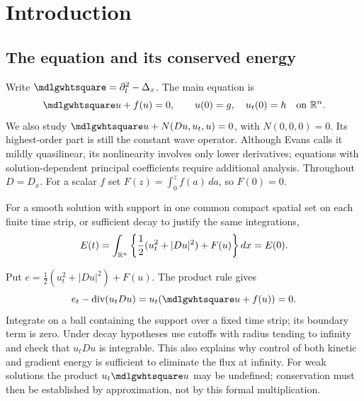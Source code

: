 \section{Introduction}
\label{sec:12-1}
\subsection{The equation and its conserved energy}
Write $\PDEWave=\partial_t^2-\Delta_x$. The main equation is
\begin{equation}\label{eq:12-semi}
 \PDEWave u+f(u)=0,\qquad u(0)=g,\quad u_t(0)=h
 \quad\hbox{on }\R^n.
\end{equation}
We also study $\PDEWave u+N(Du,u_t,u)=0$, with $N(0,0,0)=0$.
Its highest-order part is still the constant wave operator.
Although Evans calls it mildly quasilinear, its nonlinearity involves
only lower derivatives; equations with solution-dependent principal
coefficients require additional analysis. Throughout $D=D_x$.
For a scalar $f$ set $F(z)=\int_0^z f(a)\,da$, so $F(0)=0$.

\begin{theorem}
For a smooth solution with support in one common compact spatial
set on each finite time strip, or sufficient decay to justify the
same integrations,
\begin{equation}\label{eq:12-energy}
 E(t)=\int_{\mathbb{R}^n}\left\{\frac12(u_t^2+|Du|^2)+F(u)\right\}dx=E(0).
\end{equation}
\end{theorem}
\begin{expandedproof}
Put $e=\frac12(u_t^2+|Du|^2)+F(u)$. The product rule gives
\[
 e_t-\operatorname{div}(u_tDu)=u_t(\PDEWave u+f(u))=0.
\]
Integrate on a ball containing the support over a fixed time strip;
its boundary term is zero. Under decay hypotheses use cutoffs with
radius tending to infinity and check that $u_tDu$ is integrable.
This also explains why control of both kinetic and gradient energy
is sufficient to eliminate the flux at infinity. For weak solutions
the product $u_t\PDEWave u$ may be undefined; conservation must then be
established by approximation, not by this formal multiplication.
\end{expandedproof}

